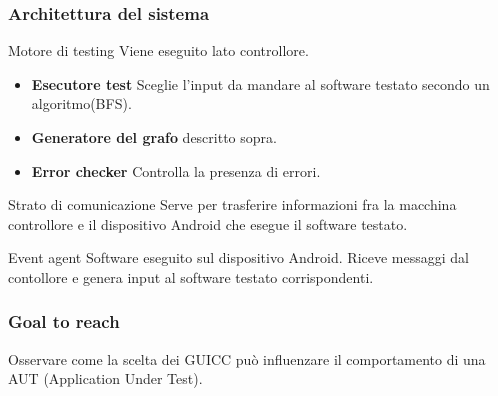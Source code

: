 \documentclass[12pt]{beamer}
\begin{document}
\begin{frame}
    \frametitle{Architettura del sistema}
    \begin{block}{Motore di testing}
        Viene eseguito lato controllore.
        \begin{itemize}
            \item \textbf{Esecutore test} Sceglie l'input da mandare al software testato secondo un algoritmo(BFS).
            \item \textbf{Generatore del grafo} descritto sopra.
            \item \textbf{Error checker} Controlla la presenza di errori.
        \end{itemize}
    \end{block}
    \begin{block}{Strato di comunicazione}
        Serve per trasferire informazioni fra la macchina controllore e il dispositivo Android che esegue il software testato.
    \end{block}
    \begin{block}{Event agent}
        Software eseguito sul dispositivo Android. Riceve messaggi dal contollore e genera input al software testato corrispondenti.
    \end{block}
\end{frame}


\begin{frame}
\frametitle{Goal to reach}
 
Osservare come la scelta dei  GUICC pu\`o influenzare il comportamento di una AUT (Application Under Test).

\end{frame}

\end{document}
